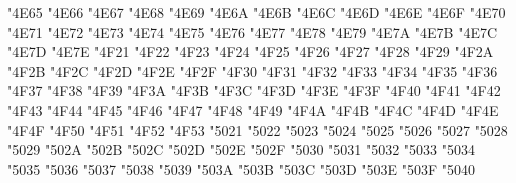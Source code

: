 {\Uchar\jis"4E65 %
\Uchar\jis"4E66 %
\Uchar\jis"4E67 %
\Uchar\jis"4E68 %
\Uchar\jis"4E69 %
\Uchar\jis"4E6A %
\Uchar\jis"4E6B %
\Uchar\jis"4E6C %
\Uchar\jis"4E6D %
\Uchar\jis"4E6E %
\Uchar\jis"4E6F %
\Uchar\jis"4E70 %
\Uchar\jis"4E71 %
\Uchar\jis"4E72 %
\Uchar\jis"4E73 %
\Uchar\jis"4E74 %
\Uchar\jis"4E75 %
\Uchar\jis"4E76 %
\Uchar\jis"4E77 %
\Uchar\jis"4E78 %
\Uchar\jis"4E79 %
\Uchar\jis"4E7A %
\Uchar\jis"4E7B %
\Uchar\jis"4E7C %
\Uchar\jis"4E7D %
\Uchar\jis"4E7E %
\Uchar\jis"4F21 %
\Uchar\jis"4F22 %
\Uchar\jis"4F23 %
\Uchar\jis"4F24 %
\Uchar\jis"4F25 %
\Uchar\jis"4F26 %
\Uchar\jis"4F27 %
\Uchar\jis"4F28 %
\Uchar\jis"4F29 %
\Uchar\jis"4F2A %
\Uchar\jis"4F2B %
\Uchar\jis"4F2C %
\Uchar\jis"4F2D %
\Uchar\jis"4F2E %
\Uchar\jis"4F2F %
\Uchar\jis"4F30 %
\Uchar\jis"4F31 %
\Uchar\jis"4F32 %
\Uchar\jis"4F33 %
\Uchar\jis"4F34 %
\Uchar\jis"4F35 %
\Uchar\jis"4F36 %
\Uchar\jis"4F37 %
\Uchar\jis"4F38 %
\Uchar\jis"4F39 %
\Uchar\jis"4F3A %
\Uchar\jis"4F3B %
\Uchar\jis"4F3C %
\Uchar\jis"4F3D %
\Uchar\jis"4F3E %
\Uchar\jis"4F3F %
\Uchar\jis"4F40 %
\Uchar\jis"4F41 %
\Uchar\jis"4F42 %
\Uchar\jis"4F43 %
\Uchar\jis"4F44 %
\Uchar\jis"4F45 %
\Uchar\jis"4F46 %
\Uchar\jis"4F47 %
\Uchar\jis"4F48 %
\Uchar\jis"4F49 %
\Uchar\jis"4F4A %
\Uchar\jis"4F4B %
\Uchar\jis"4F4C %
\Uchar\jis"4F4D %
\Uchar\jis"4F4E %
\Uchar\jis"4F4F %
\Uchar\jis"4F50 %
\Uchar\jis"4F51 %
\Uchar\jis"4F52 %
\Uchar\jis"4F53 %
\Uchar\jis"5021 %
\Uchar\jis"5022 %
\Uchar\jis"5023 %
\Uchar\jis"5024 %
\Uchar\jis"5025 %
\Uchar\jis"5026 %
\Uchar\jis"5027 %
\Uchar\jis"5028 %
\Uchar\jis"5029 %
\Uchar\jis"502A %
\Uchar\jis"502B %
\Uchar\jis"502C %
\Uchar\jis"502D %
\Uchar\jis"502E %
\Uchar\jis"502F %
\Uchar\jis"5030 %
\Uchar\jis"5031 %
\Uchar\jis"5032 %
\Uchar\jis"5033 %
\Uchar\jis"5034 %
\Uchar\jis"5035 %
\Uchar\jis"5036 %
\Uchar\jis"5037 %
\Uchar\jis"5038 %
\Uchar\jis"5039 %
\Uchar\jis"503A %
\Uchar\jis"503B %
\Uchar\jis"503C %
\Uchar\jis"503D %
\Uchar\jis"503E %
\Uchar\jis"503F %
\Uchar\jis"5040 %
}
